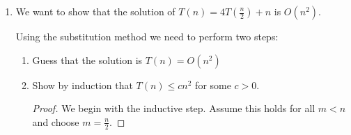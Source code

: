 \documentclass[12pt,letterpaper]{article}
\begin{document}
\begin{enumerate}
\begin{enumerate}
\begin{enumerate}
              \begin{proof} We begin with the inductive step.
                Assume this holds for all $m < n$ and choose $m = n - 1$.

                Now we have
                \[T(n-1) \le c(n-1)^2\].

                Substitute the recurrence:
                \begin{align*}
                  T(n) &\le T(n-1) + n \\
                  &= c(n-1)^2 + n \\
                  &= c(n^2-2n+1) + n \\
                  &= cn^2 - 2cn + c + n \\
                  &\le cn^2
                \end{align*}

                This holds for all $c \ge 1$

                And we still need to show the base case.
                Let's try $n = 1$.

                \begin{align*}
                  T(1) &= T(1 - 1) + 1 \\
                  &= T(0) + 1
                \end{align*}

                We want $T(1) \le c(1)^2 = c$ for some $c$ we choose.

                Since we have no explicit value for $T(0)$,
                we choose $c \ge T(0) + 1$.

                Thus we have shown that the solution holds by induction.
              \end{proof}
          \end{enumerate}

        \item
          We want to show that the solution of $T(n) = 4T\left(\frac{n}{2}\right) + n$ is $O(n^2)$.

          Using the substitution method we need to perform two steps:
          \begin{enumerate}
            \item Guess that the solution is $T(n) = O(n^2)$
            \item Show by induction that $T(n) \le cn^2$ for some $c > 0$.

              \begin{proof} We begin with the inductive step.
                Assume this holds for all $m < n$ and choose $m = \frac{n}{2}$.


\end{proof}
\end{enumerate}
\end{enumerate}
\end{enumerate}
\end{document}
